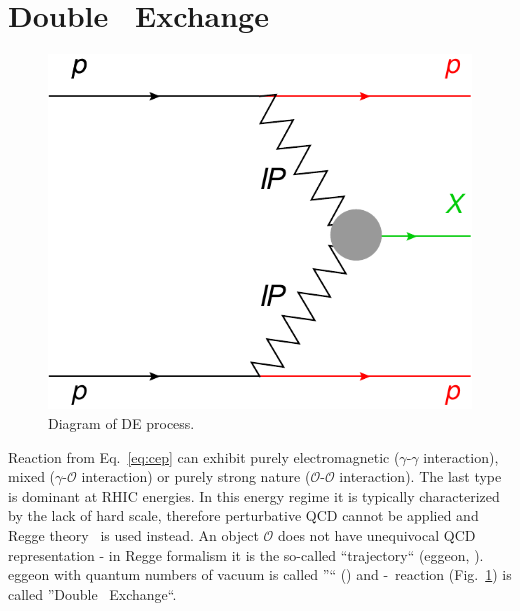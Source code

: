 \section{Double \Pomeron\  Exchange}\label{sec:DPE}

\begin{figure}\vspace*{-19pt}
  \centering
  \includegraphics[width=0.92\linewidth]{graphics/introduction/DPE.pdf}\vspace{6pt}%
  \caption{Diagram of D\Pom E process.\\}%
  \label{fig:DPE}\vspace*{-9pt}%
\end{figure}

Reaction from Eq.~\eqref{eq:cep} can exhibit purely electromagnetic ($\gamma$-$\gamma$ interaction), mixed ($\gamma$-$\mathcal{O}$ interaction) or purely strong nature ($\mathcal{O}$-$\mathcal{O}$ interaction). The last type is dominant at RHIC energies. In this energy regime it is typically characterized by the lack of hard scale, therefore perturbative QCD cannot be applied and Regge theory~\cite{IntroductionToRegge} is used instead. An object $\mathcal{O}$ does not have unequivocal QCD representation - in Regge formalism it is the so-called ``trajectory`` (\Reg eggeon, \Reg). \Reg eggeon with quantum numbers of vacuum is called ''\Pomeron`` (\Pom) and \Pom-\Pom\ reaction (Fig.~\ref{fig:DPE}) is called ''Double \Pomeron\  Exchange``. %

